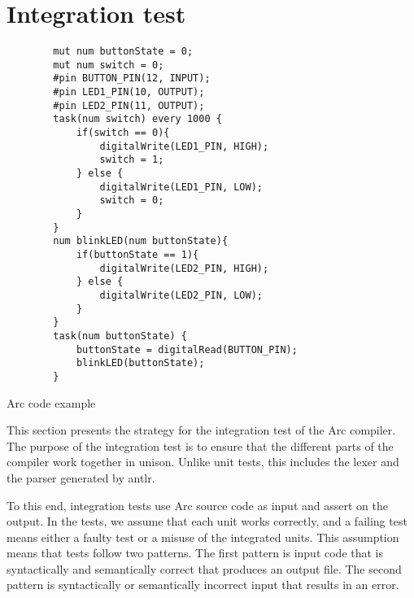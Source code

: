 \section{Integration test}\label{subsec:integrationtest}
\begin{listing}[htb!]
    \begin{verbatim}
        mut num buttonState = 0;
        mut num switch = 0;
        #pin BUTTON_PIN(12, INPUT);
        #pin LED1_PIN(10, OUTPUT);
        #pin LED2_PIN(11, OUTPUT);
        task(num switch) every 1000 {
            if(switch == 0){
                digitalWrite(LED1_PIN, HIGH);
                switch = 1;
            } else {
                digitalWrite(LED1_PIN, LOW);
                switch = 0;
            }
        }
        num blinkLED(num buttonState){
            if(buttonState == 1){
                digitalWrite(LED2_PIN, HIGH);
            } else {
                digitalWrite(LED2_PIN, LOW);
            }
        }
        task(num buttonState) {
            buttonState = digitalRead(BUTTON_PIN);
            blinkLED(buttonState);
        }
    \end{verbatim}
    \caption{Arc code example}
    \label{lst:arc code example}
\end{listing}


This section presents the strategy for the integration test of the Arc compiler. The purpose of the integration test is to ensure that the different parts of the compiler work together in unison. Unlike unit tests, this includes the lexer and the parser generated by \gls{antlr}.

To this end, integration tests use Arc source code as input and assert on the output. In the tests, we assume that each unit works correctly, and a failing test means either a faulty test or a misuse of the integrated units. This assumption means that tests follow two patterns. The first pattern is input code that is syntactically and semantically correct that produces an output file. The second pattern is syntactically or semantically incorrect input that results in an error.


